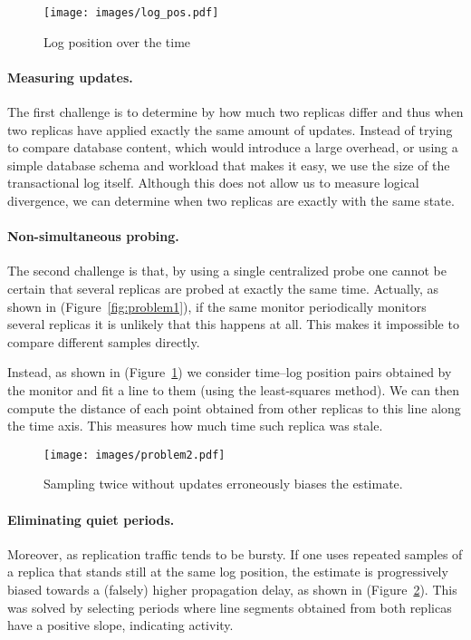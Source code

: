 \begin{figure}[t]
\centering    
\texttt{[image: images/log\_pos.pdf]}
\caption{Log position over the time}
\label{fig:interrogation}
\end{figure}


\paragraph{Measuring updates.} The first challenge is to determine by how much two replicas differ and thus when two replicas have applied exactly the same amount of updates. Instead of trying to compare database content, which would introduce a large overhead, or using a simple database schema and workload that makes it easy, we use the size of the transactional log itself. Although this does not allow us to measure logical divergence, we can determine when two replicas are exactly with the same state.

\paragraph{Non-simultaneous probing.} The second challenge is that, by using a single centralized probe one cannot be certain that several replicas are probed at exactly the same time. Actually, as shown in (Figure~\ref{fig:problem1}), if the same monitor periodically monitors several replicas it is unlikely that this happens at all. This makes it impossible to compare different samples directly.

Instead, as shown in (Figure~\ref{fig:interrogation}) we consider time--log position pairs obtained by the monitor and fit a line to them (using the least-squares method). We can then  compute the distance of each point obtained from other replicas to this line along the time axis. This measures how much time such replica was stale.

\begin{figure}[t]
\centering    
\texttt{[image: images/problem2.pdf]}
\caption{Sampling twice without updates erroneously biases the estimate.}
\label{fig:problem2}
\end{figure}

\paragraph{Eliminating quiet periods.} Moreover, as replication traffic tends to be bursty. If one uses repeated samples of a replica that stands still at the same log position, the estimate is progressively biased towards a (falsely) higher propagation delay, as shown in (Figure~\ref{fig:problem2}). This was solved by selecting periods where line segments obtained from both replicas have a positive slope, indicating activity.


